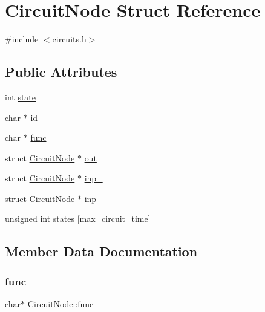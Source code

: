 \hypertarget{structCircuitNode}{}\section{Circuit\+Node Struct Reference}
\label{structCircuitNode}


{\ttfamily \#include $<$circuits.\+h$>$}

\subsection*{Public Attributes}
\begin{DoxyCompactItemize}
\item 
int \hyperlink{structCircuitNode_a92ac03847fccf255c8ac74820d6024bd}{state}
\item 
char $\ast$ \hyperlink{structCircuitNode_a15f4689d56dc078c58f4d6282f4e5919}{id}
\item 
char $\ast$ \hyperlink{structCircuitNode_a335f6ce4bad5e6a0607bcd3e32ef8ec5}{func}
\item 
struct \hyperlink{structCircuitNode}{Circuit\+Node} $\ast$ \hyperlink{structCircuitNode_ab0a56d164e02e4512d74232d4b697243}{out}
\item 
struct \hyperlink{structCircuitNode}{Circuit\+Node} $\ast$ \hyperlink{structCircuitNode_a4fb522d50f094e61ac26e3ee82c1f347}{inp\+\_}
\item 
struct \hyperlink{structCircuitNode}{Circuit\+Node} $\ast$ \hyperlink{structCircuitNode_a609d3938f14414cf88b0c56293598269}{inp\+\_}
\item 
unsigned int \hyperlink{structCircuitNode_a8f10dc142952b047ec1985c8178dcd19}{states} \mbox{[}\hyperlink{circuits_8h_aa7deac37d97b85aae9a379c55f711954}{max\+\_\+circuit\+\_\+time}\mbox{]}
\end{DoxyCompactItemize}


\subsection{Member Data Documentation}
\mbox{\label{structCircuitNode_a335f6ce4bad5e6a0607bcd3e32ef8ec5}} 
\subsubsection{\texorpdfstring{func}{func}}
{\footnotesize\ttfamily char$\ast$ Circuit\+Node\+::func}

